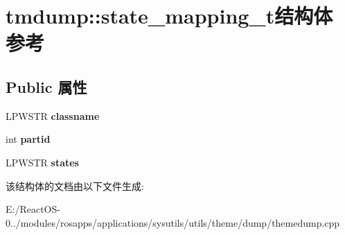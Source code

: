 \hypertarget{structtmdump_1_1state__mapping__t}{}\section{tmdump\+:\+:state\+\_\+mapping\+\_\+t结构体 参考}
\label{structtmdump_1_1state__mapping__t}
\subsection*{Public 属性}
\begin{DoxyCompactItemize}
\item 
\mbox{\label{structtmdump_1_1state__mapping__t_a77ec32547ae340819fc98fd494ce3138}} 
L\+P\+W\+S\+TR {\bfseries classname}
\item 
\mbox{\label{structtmdump_1_1state__mapping__t_ad7327f3ed2a201d70f2e9aaa3f1ac8f5}} 
int {\bfseries partid}
\item 
\mbox{\label{structtmdump_1_1state__mapping__t_ae279dd0c3affaa1bcaed31be7cb580db}} 
L\+P\+W\+S\+TR {\bfseries states}
\end{DoxyCompactItemize}


该结构体的文档由以下文件生成\+:\begin{DoxyCompactItemize}
\item 
E\+:/\+React\+O\+S-\/0../modules/rosapps/applications/sysutils/utils/theme/dump/themedump.\+cpp\end{DoxyCompactItemize}
